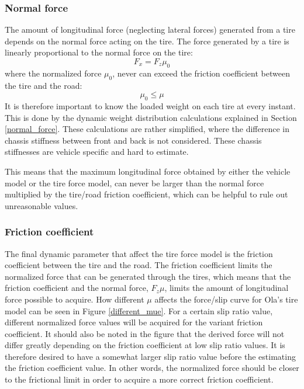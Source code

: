 \subsubsection{Normal force}
The amount of longitudinal force (neglecting lateral forces) generated from a tire depends on the normal force acting on the tire. The force generated by a tire is linearly proportional to the normal force on the tire:
\begin{equation}
	F_{x} = F_{z}\mu_{0}
\end{equation}
where the normalized force $ \mu_{0} $, never can exceed the friction coefficient between the tire and the road:
\begin{equation}
	\mu_{0} \leq \mu
\end{equation}
It is therefore important to know the loaded weight on each tire at every instant. This is done by the dynamic weight distribution calculations explained in Section \ref{normal_force}. These calculations are rather simplified, where the difference in chassis stiffness between front and back is not considered. These chassis stiffnesses are vehicle specific and hard to estimate. 

This means that the maximum longitudinal force obtained by either the vehicle model or the tire force model, can never be larger than the normal force multiplied by the tire/road friction coefficient, which can be helpful to rule out unreasonable values. 

\subsubsection{Friction coefficient}
\label{section_friction coefficient}
The final dynamic parameter that affect the tire force model is the friction coefficient between the tire and the road. The friction coefficient limits the normalized force that can be generated through the tires, which means that the friction coefficient and the normal force, $ F_{z}\mu $, limits the amount of longitudinal force possible to acquire. How different $ \mu $ affects the force/slip curve for Ola's tire model can be seen in Figure \ref{different_mue}. For a certain slip ratio value, different normalized force values will be acquired for the variant friction coefficient. It should also be noted in the figure that the derived force will not differ greatly depending on the friction coefficient at low slip ratio values. It is therefore desired to have a somewhat larger slip ratio value before the estimating the friction coefficient value. In other words, the normalized force should be closer to the frictional limit in order to acquire a more correct friction coefficient. 

